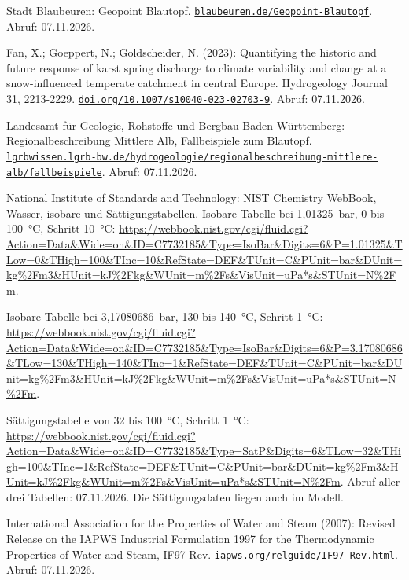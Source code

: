\begin{description}[leftmargin=8mm,labelsep=2mm]
\raggedright
{}
\renewcommand{\bibitem}[1]{\item[]}
\setlength{\itemsep}{2pt}
\def\UrlBreaks{\do/\do-\do_\do.\do=\do?\do\&}
\bibitem{stadt} [1] Stadt Blaubeuren: Geopoint Blautopf. \href{https://www.blaubeuren.de/Geopoint-Blautopf}{\nolinkurl{blaubeuren.de/Geopoint-Blautopf}}. Abruf: 07.11.2026.
\bibitem{fan} [2] Fan, X.; Goeppert, N.; Goldscheider, N. (2023): Quantifying the historic and future response of karst spring discharge to climate variability and change at a snow-influenced temperate catchment in central Europe. Hydrogeology Journal 31, 2213-2229. \href{https://doi.org/10.1007/s10040-023-02703-9}{\nolinkurl{doi.org/10.1007/s10040-023-02703-9}}. Abruf: 07.11.2026.
\bibitem{lgrb} [3] Landesamt für Geologie, Rohstoffe und Bergbau Baden-Württemberg: Regionalbeschreibung Mittlere Alb, Fallbeispiele zum Blautopf. \href{https://lgrbwissen.lgrb-bw.de/hydrogeologie/regionalbeschreibung-mittlere-alb/fallbeispiele}{\nolinkurl{lgrbwissen.lgrb-bw.de/hydrogeologie/regionalbeschreibung-mittlere-alb/fallbeispiele}}. Abruf: 07.11.2026.
\bibitem{nist} [4] National Institute of Standards and Technology: NIST Chemistry WebBook, Wasser, isobare und Sättigungstabellen. Isobare Tabelle bei 1,01325~bar, 0 bis 100~°C, Schritt 10~°C: \url{https://webbook.nist.gov/cgi/fluid.cgi?Action=Data&Wide=on&ID=C7732185&Type=IsoBar&Digits=6&P=1.01325&TLow=0&THigh=100&TInc=10&RefState=DEF&TUnit=C&PUnit=bar&DUnit=kg%2Fm3&HUnit=kJ%2Fkg&WUnit=m%2Fs&VisUnit=uPa*s&STUnit=N%2Fm}.\par Isobare Tabelle bei 3,17080686~bar, 130 bis 140~°C, Schritt 1~°C: \url{https://webbook.nist.gov/cgi/fluid.cgi?Action=Data&Wide=on&ID=C7732185&Type=IsoBar&Digits=6&P=3.17080686&TLow=130&THigh=140&TInc=1&RefState=DEF&TUnit=C&PUnit=bar&DUnit=kg%2Fm3&HUnit=kJ%2Fkg&WUnit=m%2Fs&VisUnit=uPa*s&STUnit=N%2Fm}.\par Sättigungstabelle von 32 bis 100~°C, Schritt 1~°C: \url{https://webbook.nist.gov/cgi/fluid.cgi?Action=Data&Wide=on&ID=C7732185&Type=SatP&Digits=6&TLow=32&THigh=100&TInc=1&RefState=DEF&TUnit=C&PUnit=bar&DUnit=kg%2Fm3&HUnit=kJ%2Fkg&WUnit=m%2Fs&VisUnit=uPa*s&STUnit=N%2Fm}. Abruf aller drei Tabellen: 07.11.2026. Die Sättigungsdaten liegen auch im Modell.
\bibitem{iapws} [5] International Association for the Properties of Water and Steam (2007): Revised Release on the IAPWS Industrial Formulation 1997 for the Thermodynamic Properties of Water and Steam, IF97-Rev. \href{https://iapws.org/relguide/IF97-Rev.html}{\nolinkurl{iapws.org/relguide/IF97-Rev.html}}. Abruf: 07.11.2026.

\end{description}
